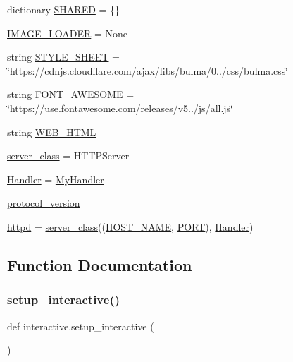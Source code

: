 \begin{DoxyCompactItemize}
\item 
dictionary \hyperlink{namespaceinteractive_a784e93ccb174d4efd2a4201d9ea4232a}{S\+H\+A\+R\+ED} = \{\}
\item 
\hyperlink{namespaceinteractive_ae897443319cfd90cd9727d40095a940c}{I\+M\+A\+G\+E\+\_\+\+L\+O\+A\+D\+ER} = None
\item 
string \hyperlink{namespaceinteractive_a90f538c1c4aa0ea6e8c2999989cfa8c3}{S\+T\+Y\+L\+E\+\_\+\+S\+H\+E\+ET} = \char`\"{}https\+://cdnjs.\+cloudflare.\+com/ajax/libs/bulma/0../css/bulma.\+css\char`\"{}
\item 
string \hyperlink{namespaceinteractive_a06d98ffd1b475c0312c2f78ae2c40885}{F\+O\+N\+T\+\_\+\+A\+W\+E\+S\+O\+ME} = \char`\"{}https\+://use.\+fontawesome.\+com/releases/v5../js/all.\+js\char`\"{}
\item 
string \hyperlink{namespaceinteractive_aca168478a6c03b82e45d2fcb96536370}{W\+E\+B\+\_\+\+H\+T\+ML}
\item 
\hyperlink{namespaceinteractive_a96f77c181c65bfcb2c21e3e466b89c2f}{server\+\_\+class} = H\+T\+T\+P\+Server
\item 
\hyperlink{namespaceinteractive_a28aaaccae824c1a30a74f3c7866cded6}{Handler} = \hyperlink{classinteractive_1_1MyHandler}{My\+Handler}
\item 
\hyperlink{namespaceinteractive_a8766aacbe8162e61228b86504efff0a9}{protocol\+\_\+version}
\item 
\hyperlink{namespaceinteractive_af85f4233639655e77d23509cde2e1bcd}{httpd} = \hyperlink{namespaceinteractive_a96f77c181c65bfcb2c21e3e466b89c2f}{server\+\_\+class}((\hyperlink{namespaceinteractive_a38d457310aa09e965304a7a638f605ca}{H\+O\+S\+T\+\_\+\+N\+A\+ME}, \hyperlink{namespaceinteractive_a29341b624435b00b983e5a91adfdc374}{P\+O\+RT}), \hyperlink{namespaceinteractive_a28aaaccae824c1a30a74f3c7866cded6}{Handler})
\end{DoxyCompactItemize}


\subsection{Function Documentation}
\mbox{\label{namespaceinteractive_a14d7f7e00e2fd76924efb506379c5c30}} 
\subsubsection{\texorpdfstring{setup\+\_\+interactive()}{setup\_interactive()}}
{\footnotesize\ttfamily def interactive.\+setup\+\_\+interactive (\begin{DoxyParamCaption}{ }\end{DoxyParamCaption})}


